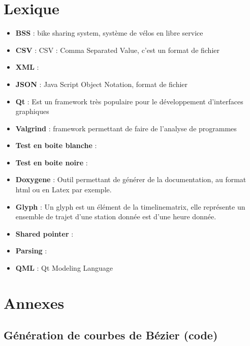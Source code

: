 \documentclass[12pt]{article}
\begin{document}
	\section{Lexique}
	\begin{itemize}
		\item[]\textbf{BSS} : bike sharing system, système de vélos en libre service\\
		\item[]\textbf{CSV} : CSV : Comma Separated Value, c'est un format de fichier\\
		\item[]\textbf{XML} :\\
		\item[]\textbf{JSON} : Java Script Object Notation, format de fichier\\
		\item[]\textbf{Qt} : Est un framework très populaire pour le développement
		d'interfaces graphiques\\
		\item[]\textbf{Valgrind} : framework permettant de faire de l'analyse de programmes\\
		\item[]\textbf{Test en boite blanche} : \\
		\item[]\textbf{Test en boite noire} :  \\
		\item[]\textbf{Doxygene} : Outil permettant de générer de la documentation,
		au format html ou en Latex par exemple.\\
		\item[]\textbf{Glyph} : Un glyph est un élément de la timelinematrix, elle
		représente un ensemble de trajet d'une station donnée est d'une heure donnée.\\
		\item[]\textbf{Shared pointer} :\\
		\item[]\textbf{Parsing} : \\
		\item[]\textbf{QML} : Qt Modeling Language\\
	\end{itemize}
	
	\newpage
		
	
	\newpage
	\section{Annexes}
		\subsection{Génération de courbes de Bézier (code)}	\label{code_courbes_bezier}
		
\end{document}
